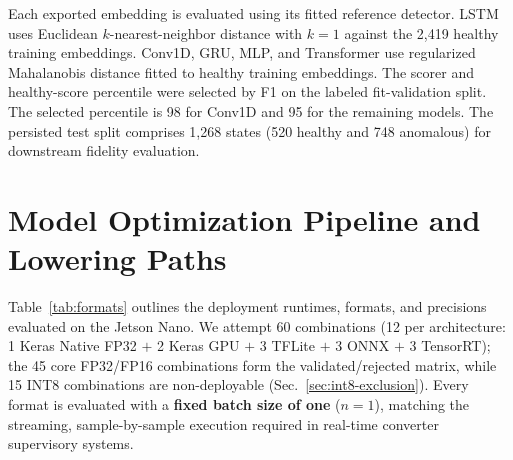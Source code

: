 \documentclass[11pt,a4paper]{article}
\begin{document}
Each exported embedding is evaluated using its fitted reference detector. LSTM uses Euclidean $k$-nearest-neighbor distance with $k=1$ against the 2,419 healthy training embeddings. Conv1D, GRU, MLP, and Transformer use regularized Mahalanobis distance fitted to healthy training embeddings. The scorer and healthy-score percentile were selected by F1 on the labeled fit-validation split. The selected percentile is 98 for Conv1D and 95 for the remaining models. The persisted test split comprises 1,268 states (520 healthy and 748 anomalous) for downstream fidelity evaluation.

\section{Model Optimization Pipeline and Lowering Paths}
\label{sec:pipeline}

Table~\ref{tab:formats} outlines the deployment runtimes, formats, and precisions evaluated on the Jetson Nano. We attempt 60 combinations (12 per architecture: 1 Keras Native FP32 $+$ 2 Keras GPU $+$ 3 TFLite $+$ 3 ONNX $+$ 3 TensorRT); the 45 core FP32/FP16 combinations form the validated/rejected matrix, while 15 INT8 combinations are non-deployable (Sec.~\ref{sec:int8-exclusion}). Every format is evaluated with a \textbf{fixed batch size of one} ($n=1$), matching the streaming, sample-by-sample execution required in real-time converter supervisory systems.

\begin{table}[t]
\centering
\caption{Evaluated deployment runtimes, lowering pathways, and precisions.}
\label{tab:formats}
\end{table}
\end{document}
